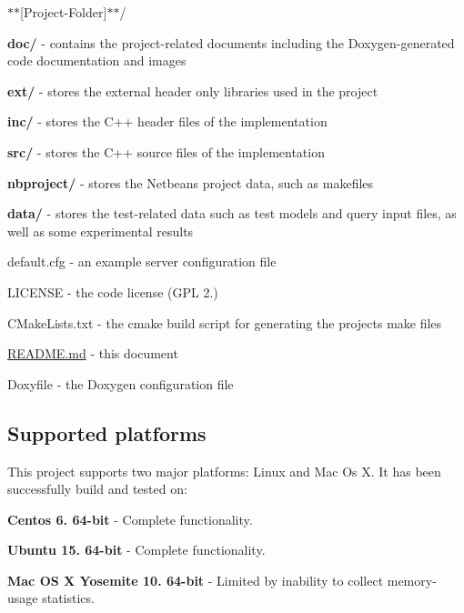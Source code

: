 \begin{DoxyItemize}
\item $\ast$$\ast${\ttfamily \mbox{[}Project-\/\+Folder\mbox{]}}$\ast$$\ast$/
\begin{DoxyItemize}
\item {\bfseries doc/} -\/ contains the project-\/related documents including the Doxygen-\/generated code documentation and images
\item {\bfseries ext/} -\/ stores the external header only libraries used in the project
\item {\bfseries inc/} -\/ stores the C++ header files of the implementation
\item {\bfseries src/} -\/ stores the C++ source files of the implementation
\item {\bfseries nbproject/} -\/ stores the Netbeans project data, such as makefiles
\item {\bfseries data/} -\/ stores the test-\/related data such as test models and query input files, as well as some experimental results
\item default.\+cfg -\/ an example server configuration file
\item L\+I\+C\+E\+N\+S\+E -\/ the code license (G\+P\+L 2.)
\item C\+Make\+Lists.\+txt -\/ the cmake build script for generating the project\textquotesingle{}s make files
\item \hyperlink{_r_e_a_d_m_e_8md}{R\+E\+A\+D\+M\+E.\+md} -\/ this document
\item Doxyfile -\/ the Doxygen configuration file
\end{DoxyItemize}
\end{DoxyItemize}

\subsection*{Supported platforms}

This project supports two major platforms\+: Linux and Mac Os X. It has been successfully build and tested on\+:


\begin{DoxyItemize}
\item {\bfseries Centos 6. 64-\/bit} -\/ Complete functionality.
\item {\bfseries Ubuntu 15. 64-\/bit} -\/ Complete functionality.
\item {\bfseries Mac O\+S X Yosemite 10. 64-\/bit} -\/ Limited by inability to collect memory-\/usage statistics.
\end{DoxyItemize}

